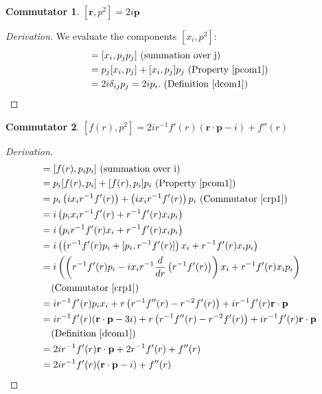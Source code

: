 \documentclass[12pt,a4paper]{report}
\theoremstyle{definition}
\newtheorem{commutator}{Commutator}[section]
\newenvironment{derivation}
  {\renewcommand\qedsymbol{$\square$}\begin{proof}[Derivation]}
  {\end{proof}}
\theoremstyle{remark}
\theoremstyle{remark}
\begin{document}
\begin{appendices}
\begin{commutator}\label{crp3}
$[\textbf{r},p^2]=2i\textbf{p}$
\end{commutator}
\begin{derivation}
We evaluate the components $[x_i,p^2]$:
\begin{align*}
[x_i,p^2] &= [x_i,p_jp_j] \text{ (summation over j)} \\
&= p_j[x_i,p_j]+[x_i,p_j]p_j \text{ (Property~\ref{pcom1})} \\
&= 2i \delta_{ij} p_j=2i p_i.  \text{ (Definition~\ref{dcom1})}
\end{align*}
\end{derivation}

\begin{commutator}\label{crp4}
$[f(r),p^2]=2i r^{-1}f'(r)(\textbf{r}\cdot\textbf{p}-i)+f''(r)$
\end{commutator}
\begin{derivation}
\begin{align*}
[f(r),p^2] &= [f(r),p_ip_i] \text{ (summation over i)}\\
&= p_i[f(r),p_i]+[f(r),p_i]p_i \text{ (Property~\ref{pcom1})} \\
&= p_i\left( i x_ir^{-1}f'(r)\right) + \left( i x_ir^{-1}f'(r)\right)p_i \text{ (Commutator~\ref{crp1})} \\
&= i\left(p_ix_ir^{-1}f'(r)+r^{-1}f'(r)x_ip_i\right) \\
&= i\left(p_ir^{-1}f'(r)x_i+r^{-1}f'(r)x_ip_i\right) \\
&= i\left(\left(r^{-1}f'(r)p_i+[p_i,r^{-1}f'(r)]\right)x_i+r^{-1}f'(r)x_ip_i\right) \\
&= i\left(\left(r^{-1}f'(r)p_i-i x_ir^{-1}\frac{d}{dr}\left(r^{-1}f'(r)\right)\right)x_i+r^{-1}f'(r)x_ip_i\right) \\
&\phantom{=} \text{ (Commutator~\ref{crp1})} \\
&= i r^{-1}f'(r)p_ix_i +r\left(r^{-1}f''(r)-r^{-2}f'(r)\right)+i r^{-1}f'(r)\textbf{r}\cdot\textbf{p} \\
&= i r^{-1}f'(r)(\textbf{r}\cdot\textbf{p}-3i) +r\left(r^{-1}f''(r)-r^{-2}f'(r)\right)+i r^{-1}f'(r)\textbf{r}\cdot\textbf{p} \\
&\phantom{=} \text{ (Definition~\ref{dcom1})} \\
&= 2i r^{-1}f'(r)\textbf{r}\cdot\textbf{p}+2r^{-1}f'(r)+f''(r) \\
&= 2i r^{-1}f'(r)(\textbf{r}\cdot\textbf{p}-i)+f''(r)
\end{align*}
\end{derivation}


\end{appendices}
\end{document}
